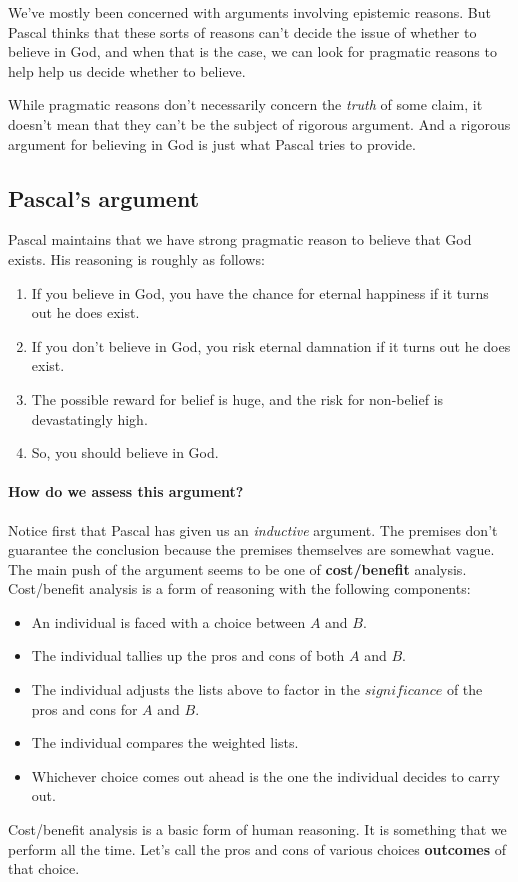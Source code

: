 We've mostly been concerned with arguments involving epistemic reasons.  But Pascal thinks that these sorts of reasons can't decide the issue of whether to believe in God, and when that is the case, we can look for pragmatic reasons to help help us decide whether to believe.

While pragmatic reasons don't necessarily concern the \textit{truth} of some claim, it doesn't mean that they can't be the subject of rigorous argument.  And a rigorous argument for believing in God is just what Pascal tries to provide.

\subsection{Pascal's argument}
Pascal maintains that we have strong pragmatic reason to believe that God exists. His reasoning is roughly as follows:
\begin{enumerate}
 \item If you believe in God, you have the chance for eternal happiness if it turns out he does exist.
 \item If you don't believe in God, you risk eternal damnation if it turns out he does exist.
 \item The possible reward for belief is huge, and the risk for non-belief is devastatingly high.
 \item So, you should believe in God.
\end{enumerate}

\paragraph{How do we assess this argument?} Notice first that Pascal has given us an \textit{inductive} argument.  The premises don't guarantee the conclusion because the premises themselves are somewhat vague. The main push of the argument seems to be one of \textbf{cost/benefit} analysis. Cost/benefit analysis is a form of reasoning with the following components:
\begin{itemize}
 \item An individual is faced with a choice between $A$ and $B$.
 \item The individual tallies up the pros and cons of both $A$ and $B$.
 \item The individual adjusts the lists above to factor in the $significance$ of the pros and cons for $A$ and $B$.
 \item The individual compares the weighted lists.
 \item Whichever choice comes out ahead is the one the individual decides to carry out.
\end{itemize}
Cost/benefit analysis is a basic form of human reasoning.  It is something that we perform all the time. Let's call the pros and cons of various choices \textbf{outcomes} of that choice.

